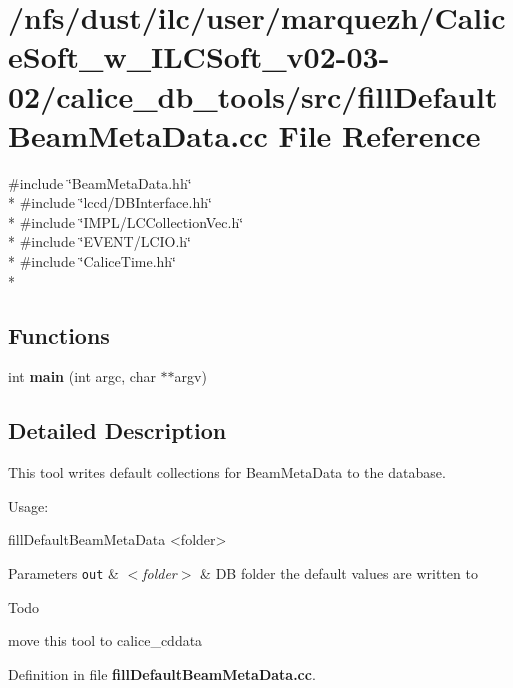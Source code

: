 \section{/nfs/dust/ilc/user/marquezh/\-Calice\-Soft\-\_\-w\-\_\-\-I\-L\-C\-Soft\-\_\-v02-\/03-\/02/calice\-\_\-db\-\_\-tools/src/fill\-Default\-Beam\-Meta\-Data.cc File Reference}
\label{fillDefaultBeamMetaData_8cc}
{\ttfamily \#include \char`\"{}Beam\-Meta\-Data.\-hh\char`\"{}}\\*
{\ttfamily \#include \char`\"{}lccd/\-D\-B\-Interface.\-hh\char`\"{}}\\*
{\ttfamily \#include \char`\"{}I\-M\-P\-L/\-L\-C\-Collection\-Vec.\-h\char`\"{}}\\*
{\ttfamily \#include \char`\"{}E\-V\-E\-N\-T/\-L\-C\-I\-O.\-h\char`\"{}}\\*
{\ttfamily \#include \char`\"{}Calice\-Time.\-hh\char`\"{}}\\*
\subsection*{Functions}
\begin{DoxyCompactItemize}
\item 
int {\bfseries main} (int argc, char $\ast$$\ast$argv)\label{fillDefaultBeamMetaData_8cc_a3c04138a5bfe5d72780bb7e82a18e627}

\end{DoxyCompactItemize}


\subsection{Detailed Description}
This tool writes default collections for Beam\-Meta\-Data to the database.

Usage\-:


\begin{DoxyCode}
fillDefaultBeamMetaData <folder>
\end{DoxyCode}



\begin{DoxyParams}[1]{Parameters}
\mbox{\tt out}  & {\em $<$folder$>$} & D\-B folder the default values are written to\\
\hline
\end{DoxyParams}
\begin{DoxyRefDesc}{Todo}
\item[{\bf Todo}]move this tool to calice\-\_\-cddata\end{DoxyRefDesc}


Definition in file {\bf fill\-Default\-Beam\-Meta\-Data.\-cc}.

